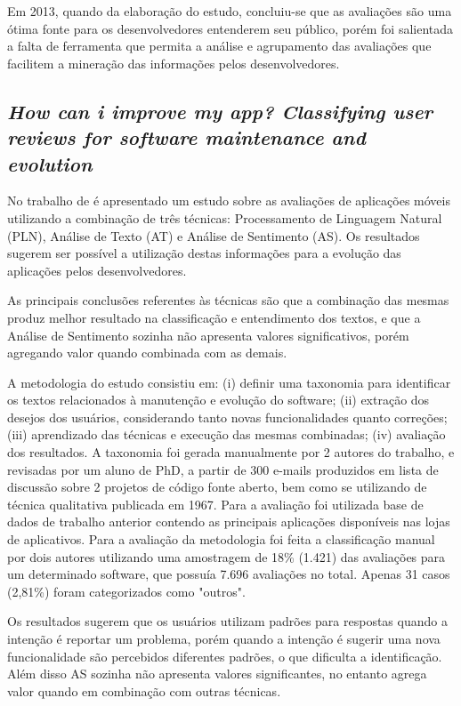 Em 2013, quando da elaboração do estudo, concluiu-se que as avaliações são uma ótima fonte para os desenvolvedores entenderem seu público, porém foi salientada a falta de ferramenta que permita a análise e agrupamento das avaliações que facilitem a mineração das informações pelos desenvolvedores.


\subsection{\textit{How can i improve my app? Classifying user reviews for software maintenance and evolution}}

No trabalho de  é apresentado um estudo sobre as avaliações de aplicações móveis utilizando a combinação de três técnicas: Processamento de Linguagem Natural (PLN), Análise de Texto (AT) e Análise de Sentimento (AS). Os resultados sugerem ser possível a utilização destas informações para a evolução das aplicações pelos desenvolvedores.

As principais conclusões referentes às técnicas são que a combinação das mesmas produz melhor resultado na classificação e entendimento dos textos, e que a Análise de Sentimento sozinha não apresenta valores significativos, porém agregando valor quando combinada com as demais.

A metodologia do estudo consistiu em: (i) definir uma taxonomia para identificar os textos relacionados à manutenção e evolução do software; (ii) extração dos desejos dos usuários, considerando tanto novas funcionalidades quanto correções; (iii) aprendizado das técnicas e execução das mesmas combinadas; (iv) avaliação dos resultados.
A taxonomia foi gerada manualmente por 2 autores do trabalho, e revisadas por um aluno de PhD, a partir de 300 e-mails produzidos em lista de discussão sobre 2 projetos de código fonte aberto, bem como se utilizando de técnica qualitativa publicada em 1967. Para a avaliação foi utilizada base de dados de trabalho anterior contendo as principais aplicações disponíveis nas lojas de aplicativos. Para a avaliação da metodologia foi feita a classificação manual por dois autores utilizando uma amostragem de 18\% (1.421) das avaliações para um determinado software, que possuía 7.696 avaliações no total. Apenas 31 casos (2,81\%) foram categorizados como "outros".

Os resultados sugerem que os usuários utilizam padrões para respostas quando a intenção é reportar um problema, porém quando a intenção é sugerir uma nova funcionalidade são percebidos diferentes padrões, o que dificulta a identificação. Além disso AS sozinha não apresenta valores significantes, no entanto agrega valor quando em combinação com outras técnicas.

